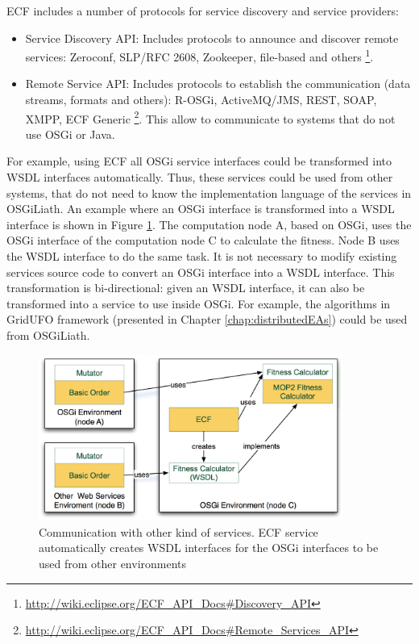 ECF includes a number of protocols for service discovery and service providers:
\begin{itemize}
\item Service Discovery API: Includes protocols to announce and discover remote services: Zeroconf, SLP/RFC 2608, Zookeeper, file-based and others \footnote{\url{http://wiki.eclipse.org/ECF_API_Docs\#Discovery_API}}.
\item Remote Service API: Includes protocols to establish the communication (data streams, formats and others): R-OSGi, ActiveMQ/JMS, REST, SOAP, XMPP, ECF Generic \footnote{\url{http://wiki.eclipse.org/ECF_API_Docs\#Remote_Services_API}}. This allow to communicate to systems that do not use OSGi or Java.
\end{itemize}

For example, using ECF all OSGi service interfaces could be transformed into WSDL interfaces automatically. Thus, these services could be used from other systems, that do not need to know the implementation language of the services in OSGiLiath. An example where an OSGi interface is transformed into a WSDL interface is shown in Figure \ref{AXISFIGURE}. The computation node A, based on OSGi, uses the OSGi interface of the computation node C to calculate the fitness. Node B uses the WSDL interface to do the same task. It is not necessary to modify existing services source code to convert an OSGi interface into a WSDL interface. This transformation is bi-directional: given an WSDL interface, it can also be transformed into a service to use inside OSGi. For example, the algorithms in GridUFO framework (presented in Chapter \ref{chap:distributedEAs}) could be used from OSGiLiath.






\begin{figure}
\centering
\includegraphics[width=10cm]{gfx/osgiliath/axis.png}


\caption{Communication with other kind of services. ECF service automatically creates WSDL interfaces for the OSGi interfaces to be used from other environments}
\label{AXISFIGURE}
\end{figure}

